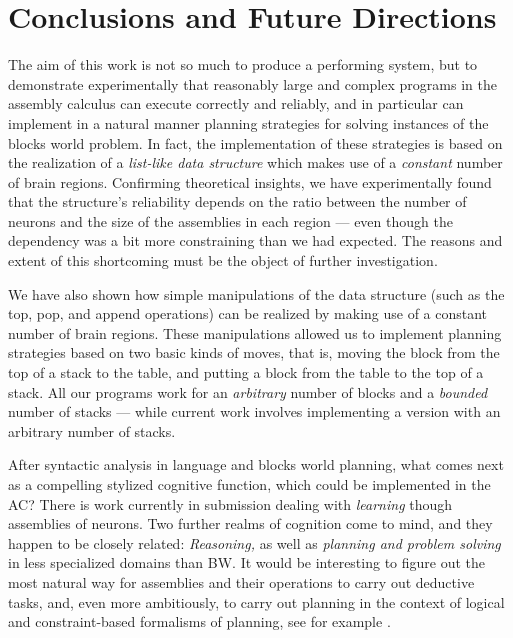 \documentclass[letterpaper]{article}
\begin{document}
\section{Conclusions and Future Directions}\label{sec:conclusions}

The aim of this work is not so much to produce a performing system, but to demonstrate experimentally that reasonably large and complex programs in the assembly calculus can execute correctly and reliably, and in particular can implement in a natural manner planning strategies for solving instances of the blocks world problem. In fact, the implementation of these strategies is based on the realization of a \textit{list-like data structure} which makes use of a \textit{constant} number of brain regions. Confirming theoretical insights, we have experimentally found that the structure's reliability depends on the ratio between the number of neurons and the size of the assemblies in each region --- even though the dependency was a bit more constraining than we had expected.  The reasons and extent of this shortcoming must be the object of further investigation.

We have also shown how simple manipulations of the data structure (such as the top, pop, and append operations) can be realized by making use of a constant number of brain regions. These manipulations allowed us to implement planning strategies based on two basic kinds of moves, that is, moving the block from the top of a stack to the table, and putting a block from the table to the top of a stack. All our programs work for an \textit{arbitrary} number of blocks and a \textit{bounded} number of stacks --- while current work involves implementing a version with an arbitrary number of stacks.

After syntactic analysis in language and blocks world planning, what comes next as a compelling stylized cognitive function, which could be implemented in the AC?  There is work currently in submission dealing with {\em learning} though assemblies of neurons.  Two further realms of cognition come to mind, and they happen to be closely related:  {\em Reasoning,} as well as {\em planning and problem solving} in less specialized domains than BW. It would be interesting to figure out the most natural way for assemblies and their operations to carry out deductive tasks, and, even more ambitiously, to carry out planning in the context of logical and constraint-based formalisms of planning, see for example \cite{wilkins-book}.
\end{document}
